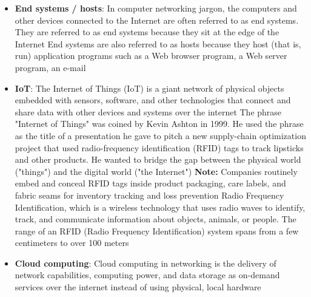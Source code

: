 \documentclass{report}
\begin{document}
\begin{itemize}
\begin{enumerate}
                \item \textbf{The Exchange:} You speak in a shared language like English, taking turns so you do not talk over each other (data transmission rules).
                \item \textbf{The Goodbye:} You both say goodbye and hang up to end the call (terminating the connection)
            \end{enumerate}
            If one person spoke only code and the other spoke Spanish, or if both screamed at the exact same time without listening, the conversation would fail. A networking protocol prevents this failure for computers.
        \item \textbf{End systems / hosts}: In computer networking jargon, the computers and other devices connected to the Internet are often referred to as end systems. They are referred to as end systems because they sit at the edge of the Internet
            \bigbreak \noindent 
            End systems are also referred to as hosts because they host (that is, run) application programs such as a Web browser program, a Web server program, an e-mail 
        \item \textbf{IoT}: The Internet of Things (IoT) is a giant network of physical objects embedded with sensors, software, and other technologies that connect and share data with other devices and systems over the internet
            \bigbreak \noindent 
            The phrase "Internet of Things" was coined by Kevin Ashton in 1999.  He used the phrase as the title of a presentation he gave to pitch a new supply-chain optimization project that used radio-frequency identification (RFID) tags to track lipsticks and other products. He wanted to bridge the gap between the physical world ("things") and the digital world ("the Internet")
            \bigbreak \noindent 
            \textbf{Note:} Companies routinely embed and conceal RFID tags inside product packaging, care labels, and fabric seams for inventory tracking and loss prevention
            \bigbreak \noindent 
            Radio Frequency Identification, which is a wireless technology that uses radio waves to identify, track, and communicate information about objects, animals, or people.  The range of an RFID (Radio Frequency Identification) system spans from a few centimeters to over 100 meters
        \item \textbf{Cloud computing}: Cloud computing in networking is the delivery of network capabilities, computing power, and data storage as on-demand services over the internet instead of using physical, local hardware

\end{itemize}
\end{document}

